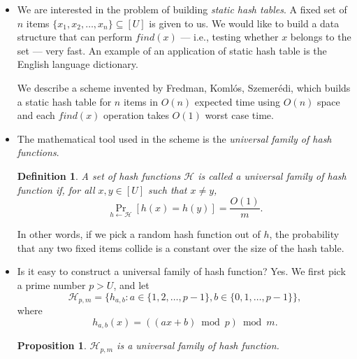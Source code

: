 \documentclass{article}
\newtheorem{definition}[lemma]{Definition}
\newtheorem{proposition}[lemma]{Proposition}
\begin{document}
\begin{itemize}
\item We are interested in the problem of building \emph{static hash tables}. A fixed set of $n$ items $\{x_1, x_2, \dotsc, x_n \} \subseteq [U]$ is given to us. We would like to build a data structure that can perform $find(x)$ --- i.e., testing whether $x$ belongs to the set --- very fast. An example of an application of static hash table is the English language dictionary.

We describe a scheme invented by Fredman, Koml\'{o}s, Szemer\'{e}di, which builds a static hash table for $n$ items in $O(n)$ expected time using $O(n)$ space and each $find(x)$ operation takes $O(1)$ worst case time.

\item The mathematical tool used in the scheme is the \emph{universal family of hash functions}.

\begin{definition}
A set of hash functions $\mathcal{H}$ is called a \emph{universal family of hash function} if, for all $x, y \in [U]$ such that $x \neq y$, $$\Pr_{h \leftarrow \mathcal{H}} [h(x) = h(y)] = \frac{O(1)}{m}.$$
\end{definition}

In other words, if we pick a random hash function out of $h$, the probability that any two fixed items collide is a constant over the size of the hash table.

\item Is it easy to construct a universal family of hash function? Yes. We first pick a prime number $p > U$, and let $$\mathcal{H}_{p,m} = \{ h_{a,b} : a \in \{1, 2, \dotsc, p-1\}, b \in \{0, 1, \dotsc, p-1 \} \},$$ where $$h_{a,b}(x) = ((ax + b) \bmod p) \bmod m.$$
\begin{proposition}
$\mathcal{H}_{p,m}$ is a universal family of hash function.
\end{proposition}


\end{itemize}
\end{document}
